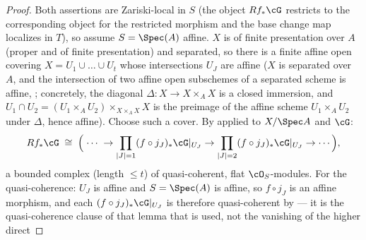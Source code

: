 \begin{proof}
Both assertions are Zariski-local in $S$ (the object $Rf_*\cG$
restricts to the corresponding object for the restricted morphism and
the base change map localizes in $T$), so assume $S=\Spec(A)$ affine.
$X$ is of finite presentation over $A$ (proper and of finite
presentation) and separated, so there is a finite affine open covering
$X=U_1\cup\dots\cup U_t$ whose intersections $U_J$ are affine
($X$ is separated over $A$, and the intersection of two affine open
subschemes of a separated scheme is affine,
; concretely, the diagonal
$\Delta:X\to X\times_AX$ is a closed immersion, and
$U_1\cap U_2=(U_1\times_AU_2)\times_{X\times_AX}X$ is the preimage of
the affine scheme $U_1\times_AU_2$ under $\Delta$, hence affine).
Choose such a cover.  By  applied to
$X/\Spec A$ and $\cG$:
\[
Rf_*\cG\;\cong\;\Bigl(\;\cdots\;\to\prod_{|J|=1}(f\circ j_J)_*\cG|_{U_J}
\to\prod_{|J|=2}(f\circ j_J)_*\cG|_{U_J}\to\cdots\Bigr),
\]
a bounded complex (length $\le t$) of quasi-coherent, flat
$\cO_S$-modules.  For the quasi-coherence: $U_J$ is affine and
$S=\Spec(A)$ is affine, so $f\circ j_J$ is an affine morphism, and
each $(f\circ j_J)_*\cG|_{U_J}$ is therefore quasi-coherent by
 --- it is the quasi-coherence clause
of that lemma that is used, not the vanishing of the higher direct

\end{proof}
